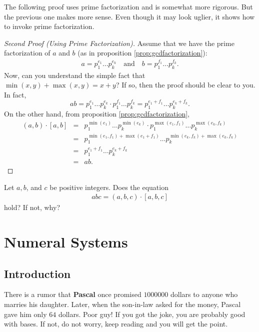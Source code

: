 \documentclass{subfile}
\begin{document}
	The following proof uses prime factorization and is somewhat more rigorous. But the previous one makes more sense. Even though it may look uglier, it shows how to invoke prime factorization.
	\begin{proof}[Second Proof (Using Prime Factorization)]
		Assume that we have the prime factorization of $a$ and $b$ (as in proposition \eqref{prop:gcdfactorization}):
		\begin{align*}
			a =p_1^{e_1}\dots p_k^{e_k} \quad \text{and} \quad b =p_1^{f_1}\dots p_k^{f_k}.
		\end{align*}
		Now, can you understand the simple fact that $\min(x,y)+\max(x,y)=x+y$? If so, then the proof should be clear to you. In fact,
		\[ab=p_1^{e_1}\dots p_k^{e_k}\cdot p_1^{f_1}\dots p_k^{f_k}=p_1^{e_1+f_1}\dots p_k^{e_k+f_k}.\]
		On the other hand, from proposition \eqref{prop:gcdfactorization},
		\begin{eqnarray*}
			(a,b)\cdot[a,b]
			& = & p_1^{\min(e_1)}\dots p_k^{\min(e_k)}\cdot p_1^{\max(e_1,f_1)}\dots p_k^{\max(e_k,f_k)}\\
			& = & p_1^{\min(e_1,f_1)+\max(e_1+f_1)}\dots p_k^{\min(e_k,f_k)+\max(e_k,f_k)}\\
			& = & p_1^{e_1+f_1}\dots p_k^{e_k+f_k}\\
			& = & ab.
		\end{eqnarray*}
	\end{proof}

	\begin{question}
		Let $a,b$, and $c$ be positive integers. Does the equation
		\begin{align*}
			abc=(a,b,c)\cdot[a,b,c]
		\end{align*}
		hold? If not, why?
	\end{question}

	\section{Numeral Systems}
	\subsection{Introduction}
	There is a rumor that \textbf{Pascal} once promised $1000000$ dollars to anyone who marries his daughter. Later, when the son-in-law asked for the money, Pascal gave him only $64$ dollars. Poor guy! If you got the joke, you are probably good with bases. If not, do not worry, keep reading and you will get the point.
\end{document}
